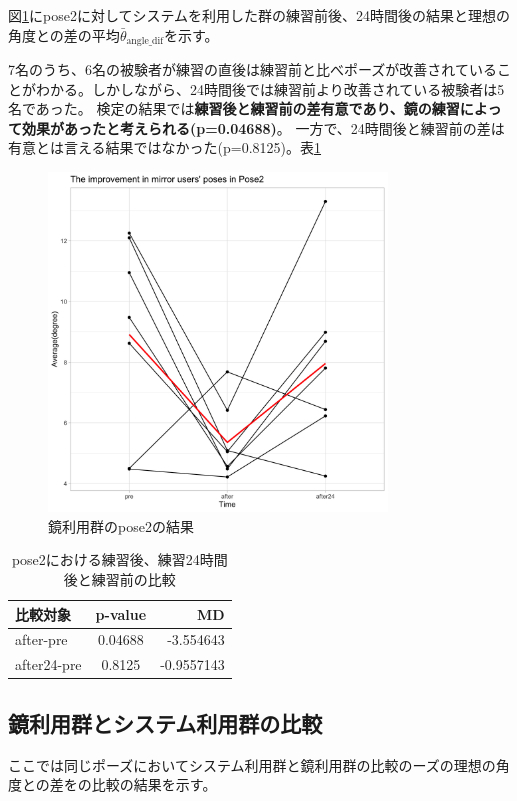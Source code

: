         図\ref{fig:pose2_mirror}にpose2に対してシステムを利用した群の練習前後、24時間後の結果と理想の角度との差の平均\(\bar{\theta}_{\text{angle\_dif}}\)を示す。


      7名のうち、6名の被験者が練習の直後は練習前と比べポーズが改善されていることがわかる。しかしながら、24時間後では練習前より改善されている被験者は5名であった。
      検定の結果では{\bf 練習後と練習前の差有意であり、鏡の練習によって効果があったと考えられる(p=0.04688)}。 一方で、24時間後と練習前の差は有意とは言える結果ではなかった(p=0.8125)。表\ref{table:pose2_mirror_p_value}
      \begin{figure}[H]
        \begin{center}
        \includegraphics[width=9cm]{figures/pose2_system_false_graph.png}
        \caption{鏡利用群のpose2の結果}
        \label{fig:pose2_mirror}
        \end{center}
      \end{figure}

      \begin{table}[h]
        \centering
        \caption{pose2における練習後、練習24時間後と練習前の比較}
        \begin{tabular}{lcr}
        \hline
        \textbf{比較対象} & \textbf{p-value} & \textbf{MD} \\ \hline
        after-pre & 0.04688 & -3.554643 \\ \hline
        after24-pre & 0.8125 & -0.9557143 \\ \hline
        \end{tabular}
        \label{table:pose2_mirror_p_value}
        \end{table}

  \subsection{鏡利用群とシステム利用群の比較}
    ここでは同じポーズにおいてシステム利用群と鏡利用群の比較のーズの理想の角度との差をの比較の結果を示す。

